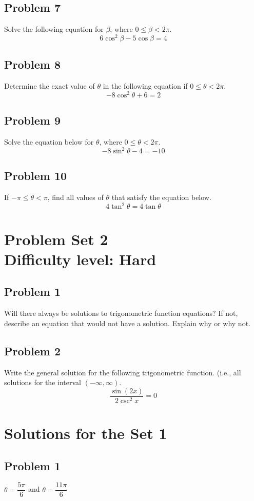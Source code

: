 \documentclass[12pt]{article}
\begin{document}
\subsection*{Problem 7}
Solve the following equation for \(\beta\), where \(0 \leq \beta < 2\pi\).
\[6\cos^2 \beta - 5\cos \beta = 4\]

\subsection*{Problem 8}
Determine the exact value of \(\theta\) in the following equation if \(0 \leq \theta < 2\pi\).
\[-8\cos^2 \theta + 6 = 2\]

\subsection*{Problem 9}
Solve the equation below for \(\theta\), where \(0 \leq \theta < 2\pi\).
\[-8\sin^2 \theta - 4 = -10\]

\subsection*{Problem 10}
If \(-\pi \leq \theta < \pi\), find all values of \(\theta\) that satisfy the equation below.
\[4\tan^2 \theta = 4\tan \theta\]

\section*{Problem Set 2\\Difficulty level: Hard}
\subsection*{Problem 1}
Will there always be solutions to trigonometric function equations? If not, describe an equation that would not have a solution. Explain why or why not.

\subsection*{Problem 2}
Write the general solution for the following trigonometric function. (i.e., all solutions for the interval \((-\infty,\infty)\).
\[\dfrac{\sin(2x)}{2\csc^2x}=0\]

\newpage
\section*{Solutions for the Set 1}
\subsection*{Problem 1}
\(\theta=\dfrac{5\pi}{6}\) and \(\theta=\dfrac{11\pi}{6}\)
\end{document}
